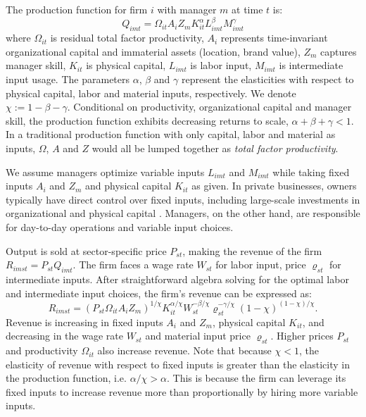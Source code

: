 \documentclass[11pt,a4paper]{article}
\begin{document}
The production function for firm $i$ with manager $m$ at time $t$ is:
\begin{equation}\label{eq:production}
Q_{imt} = \Omega_{it}A_i Z_{m}  K_{it}^\alpha L_{imt}^{\beta} M_{imt}^{\gamma}
\end{equation}
where $\Omega_{it}$ is residual total factor productivity, $A_i$ represents time-invariant organizational capital and immaterial assets (location, brand value), $Z_m$ captures manager skill, $K_{it}$ is physical capital, $L_{imt}$ is labor input, $M_{imt}$ is intermediate input usage. The parameters $\alpha$, $\beta$ and $\gamma$ represent the elasticities with respect to physical capital, labor and material inputs, respectively. We denote $\chi := 1 - \beta - \gamma$. Conditional on productivity, organizational capital and manager skill, the production function exhibits decreasing returns to scale, $\alpha + \beta + \gamma < 1$. In a traditional production function with only capital, labor and material as inputs, $\Omega$, $A$ and $Z$ would all be lumped together as \emph{total factor productivity}.

We assume managers optimize variable inputs $L_{imt}$ and $M_{imt}$ while taking fixed inputs $A_{i}$ and $Z_m$ and physical capital $K_{it}$ as given. In private businesses, owners typically have direct control over fixed inputs, including large-scale investments in organizational and physical capital \citep{Navaretti2010EFIGE}. Managers, on the other hand, are responsible for day-to-day operations and variable input choices.

Output is sold at sector-specific price $P_{st}$, making the revenue of the firm $R_{imst} = P_{st}Q_{imt}$. The firm faces a wage rate $W_{st}$ for labor input, price $\varrho_{st}$ for intermediate inputs. After straightforward algebra solving for the optimal labor and intermediate input choices, the firm's revenue can be expressed as:
\begin{equation}\label{eq:revenue}
R_{imst} = (P_{st}\Omega_{it}A_i Z_m)^{1/\chi}
K_{it}^{\alpha/\chi}
W_{st}^{-\beta/\chi}
\varrho_{st}^{-\gamma/\chi}
(1-\chi)^{(1-\chi)/\chi}.
\end{equation}
Revenue is increasing in fixed inputs $A_i$ and $Z_m$, physical capital $K_{it}$, and decreasing in the wage rate $W_{st}$ and material input price $\varrho_{st}$. Higher prices $P_{st}$ and productivity $\Omega_{it}$ also increase revenue. Note that because $\chi<1$, the elasticity of revenue with respect to fixed inputs is greater than the elasticity in the production function, i.e. $\alpha/\chi > \alpha$. This is because the firm can leverage its fixed inputs to increase revenue more than proportionally by hiring more variable inputs.
\end{document}
